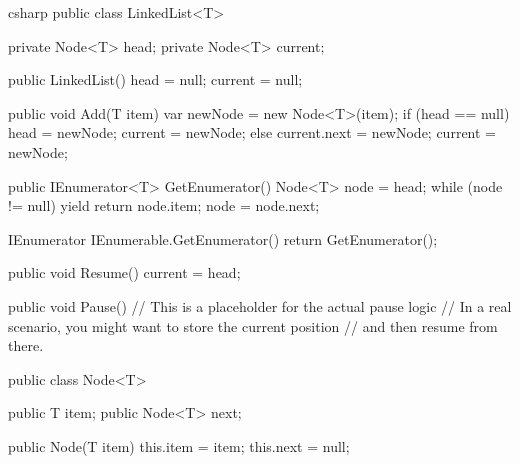 csharp
public class LinkedList<T>
{
    private Node<T> head;
    private Node<T> current;

    public LinkedList()
    {
        head = null;
        current = null;
    }

    public void Add(T item)
    {
        var newNode = new Node<T>(item);
        if (head == null)
        {
            head = newNode;
            current = newNode;
        }
        else
        {
            current.next = newNode;
            current = newNode;
        }
    }

    public IEnumerator<T> GetEnumerator()
    {
        Node<T> node = head;
        while (node != null)
        {
            yield return node.item;
            node = node.next;
        }
    }

    IEnumerator IEnumerable.GetEnumerator()
    {
        return GetEnumerator();
    }

    public void Resume()
    {
        current = head;
    }

    public void Pause()
    {
        // This is a placeholder for the actual pause logic
        // In a real scenario, you might want to store the current position
        // and then resume from there.
    }
}

public class Node<T>
{
    public T item;
    public Node<T> next;

    public Node(T item)
    {
        this.item = item;
        this.next = null;
    }
}